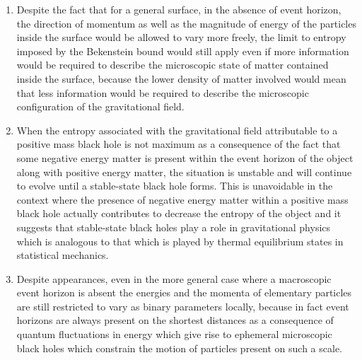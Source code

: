 \documentclass[notitlepage,12pt]{report}
\begin{document}
\begin{enumerate}
\item Despite the fact that for a general surface, in the absence of event horizon, the direction of momentum as well as the magnitude of energy of the particles inside the surface would be allowed to vary more freely, the limit to entropy imposed by the Bekenstein bound would still apply even if more information would be required to describe the microscopic state of matter contained inside the surface, because the lower density of matter involved would mean that less information would be required to describe the microscopic configuration of the gravitational field.

\item When the entropy associated with the gravitational field attributable to a positive mass black hole is not maximum as a consequence of the fact that some negative energy matter is present within the event horizon of the object along with positive energy matter, the situation is unstable and will continue to evolve until a stable-state black hole forms. This is unavoidable in the context where the presence of negative energy matter within a positive mass black hole actually contributes to decrease the entropy of the object and it suggests that stable-state black holes play a role in gravitational physics which is analogous to that which is played by thermal equilibrium states in statistical mechanics.

\item Despite appearances, even in the more general case where a macroscopic event horizon is absent the energies and the momenta of elementary particles are still restricted to vary as binary parameters locally, because in fact event horizons are always present on the shortest distances as a consequence of quantum fluctuations in energy which give rise to ephemeral microscopic black holes which constrain the motion of particles present on such a scale.


\end{enumerate}
\end{document}
